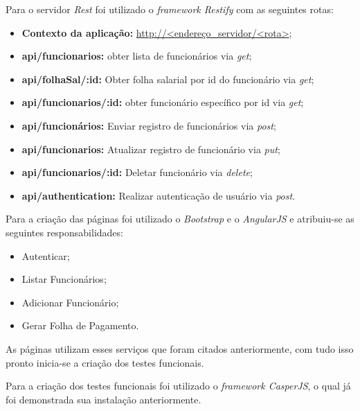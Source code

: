 \par Para o servidor \textit{Rest} foi utilizado o \textit{framework Restify} com as seguintes rotas:
\begin{itemize}
 \item \textbf{Contexto da aplicação:} \url{http://<endereço_servidor/<rota>};
 
 \item \textbf{api/funcionarios:} obter lista de funcionários via \textit{get};
 
\item \textbf{api/folhaSal/:id:} Obter folha salarial por id do funcionário via \textit{get};

\item \textbf{api/funcionarios/:id:} obter funcionário específico por id via \textit{get};

\item \textbf{api/funcionários:}  Enviar registro de funcionários via \textit{post};

\item \textbf{api/funcionarios:} Atualizar registro de funcionário via \textit{put};

\item \textbf{api/funcionarios/:id:} Deletar funcionário via \textit{delete};

\item \textbf{api/authentication:} Realizar autenticação de usuário via \textit{post}.

\end{itemize}

\par Para a criação das páginas foi utilizado o \textit{Bootstrap} e o \textit{AngularJS} e atribuiu-se as seguintes responsabilidades:
\begin{itemize}
 \item Autenticar;
 \item Listar Funcionários;
 \item Adicionar Funcionário;
 \item Gerar Folha de Pagamento.
\end{itemize}

\par As páginas utilizam esses serviços que foram citados anteriormente, com tudo isso pronto inicia-se a criação dos testes funcionais.

\par Para a criação dos testes funcionais foi utilizado o \textit{framework CasperJS}, o qual já foi demonstrada sua instalação anteriormente.


